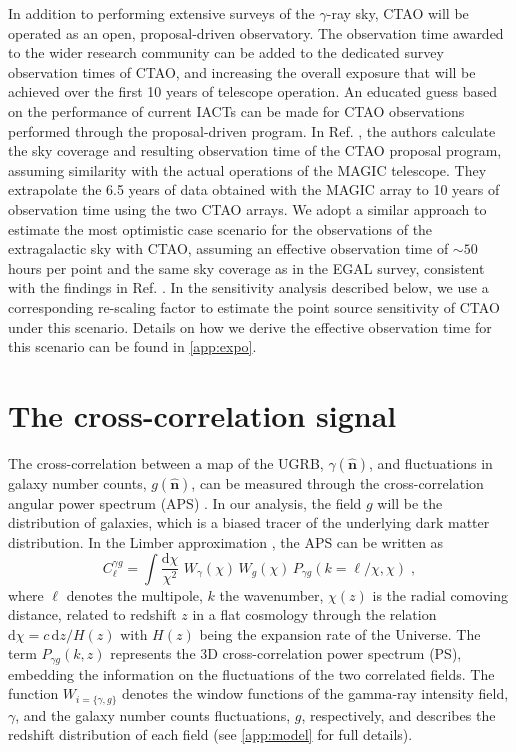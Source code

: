 \documentclass[aps,prd,a4paper,reprint,nofootinbib,superscriptaddress,floatfix,preprintnumbers]{revtex4-2}
\newcommand{\de}{\textrm{d}}
\begin{document}
In addition to performing extensive surveys of the $\gamma$-ray sky, CTAO will be operated as an open, proposal-driven observatory. The observation time awarded to the wider research community can be added to the dedicated survey observation times of CTAO, and increasing the overall exposure that will be achieved over the first 10 years of telescope operation. An educated guess based on the performance of current IACTs can be made for CTAO observations performed through the proposal-driven program. In {Ref.} \cite{Coronado_Blazquez_2021}, the authors calculate the sky coverage and resulting observation time of the CTAO proposal program, assuming similarity with the actual operations of the MAGIC telescope. They extrapolate the 6.5 years of data obtained with the MAGIC array to 10 years of observation time using the two CTAO arrays. We adopt a similar approach to estimate the most optimistic case scenario for the observations of the extragalactic sky with CTAO, assuming an effective observation time of $\sim50$ hours per point and the same sky coverage as in the EGAL survey, consistent with the findings in {Ref.} \cite{Coronado_Blazquez_2021}. In the sensitivity analysis described below, we use a corresponding re-scaling factor to estimate the point source sensitivity of CTAO {under this scenario}. Details on how we derive the effective observation time for this scenario can be found in {\cref{app:expo}}.

\section{The cross-correlation signal}
\label{sec:formalism}

The cross-correlation between a map of the UGRB, $\gamma(\hat{\bm n})$, and fluctuations in galaxy number counts, $g(\hat{\bm n})$, can be measured through the cross-correlation angular power spectrum (APS) \cite{Camera:2012cj,Camera_2015,Fornengo:2013rga}. In our analysis, the field $g$ will be the distribution of galaxies, which is a biased tracer of the underlying dark matter distribution. 
In the Limber approximation \citep{Limber:1953apj,1992ApJ...388..272K,1998ApJ...498...26K}, the APS can be written as~{\cite{Camera:2012cj,Camera_2015,Fornengo:2013rga}}
\begin{equation}
 C_\ell^{\gamma g}=\int \frac{\de\chi}{\chi^2}\,\,W_{\gamma}(\chi)\, W_g(\chi)\,P_{\gamma g}\left(k=\ell/\chi,\chi\right)\;,
\label{eq:clfin}    
\end{equation}
%
 where $\ell$ denotes the multipole, $k$ the wavenumber, $\chi(z)$ is the radial comoving distance, related to redshift $z$ in a flat cosmology through the relation $\de\chi=c\,\de z/H(z)$ with $H(z)$ being the expansion rate of the Universe. The term $P_{\gamma g}(k,z)$ represents the 3D cross-correlation power spectrum (PS), embedding the information on the fluctuations of the two correlated fields. The function $W_{i=\{\gamma,g\}}$ denotes the window functions of the gamma-ray intensity field, $\gamma$, and the galaxy number counts fluctuations, $g$, {respectively, and describes the redshift distribution of each field} (see {\cref{app:model}} for full details).
 
\end{document}
